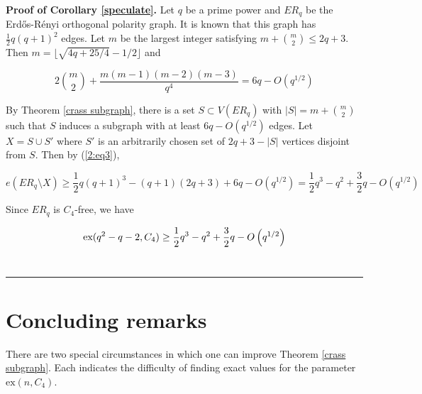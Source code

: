 \documentclass[12pt]{article}
\newenvironment{proof}[1][Proof]{\noindent\textbf{#1.} }
{\hfill \ \rule{0.5em}{0.5em}}
\begin{document}
\begin{proof}[Proof of Corollary \ref{speculate}]
    Let $q$ be a prime power and $ER_q$ be the Erd\H{o}s-R\'{e}nyi orthogonal polarity graph.  It is known that this graph has
    $\frac{1}{2}q(q+1)^2$ edges.  Let $m$ be the largest integer satisfying $m+\binom{m}{2} \leq 2q+3$.
    Then $m = \lfloor \sqrt{4q + 25/4}  - 1/2 \rfloor$ and

    $$ 2 \binom{m}{2} + \frac{ m (m - 1)(m-2)(m-3) }{q^4} = 6q - O(q^{1/2} ) $$

    By Theorem \ref{crass subgraph}, there is a set $S \subset V(ER_q)$ with $|S| = m + \binom{m}{2}$ such that
    $S$ induces a subgraph with at least $6q - O (q^{1/2})$ edges.  Let $X = S \cup S'$ where $S'$ is an arbitrarily chosen set of
    $2q + 3 - |S|$ vertices disjoint from $S$.  Then by (\ref{2:eq3}),

    $$ e( ER_q \setminus X) \geq \frac{1}{2}q(q+1)^3 - (q+1)(2q +3) + 6q - O(q^{1/2} ) =  \frac{1}{2}q^3 - q^2 + \frac{3}{2}q - O\left(q^{1/2}\right) $$

    Since $ER_q$ is $C_4$-free, we have

    $$ \textup{ex}( q^2 - q - 2 , C_4)  \geq \frac{1}{2}q^3 - q^2 + \frac{3}{2}q - O\left(q^{1/2}\right) $$
\end{proof}


\section{Concluding remarks}\label{remark}


There are two special circumstances in which one can improve Theorem \ref{crass subgraph}. Each indicates the difficulty of finding exact values for the parameter $\mathrm{ex}(n, C_4)$.
\end{document}
